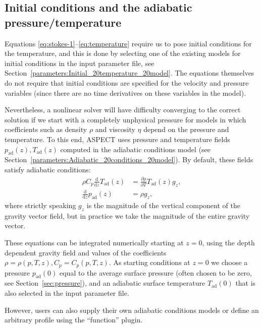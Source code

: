 \documentclass{article}
\newcommand{\aspect}{\textsc{ASPECT}}
\begin{document}
\subsection{Initial conditions and the adiabatic pressure/temperature}
\label{sec:adiabatic}

Equations \eqref{eq:stokes-1}--\eqref{eq:temperature} require us to
pose initial conditions for the temperature, and this is done by
selecting one of the existing models for initial conditions in the
input parameter file, see
Section~\ref{parameters:Initial_20temperature_20model}. The equations
themselves do not require that initial conditions are specified for
the velocity and pressure variables (since there are no time
derivatives on these variables in the model).

Nevertheless, a nonlinear solver will have difficulty converging to
the correct solution if we start with a completely unphysical pressure
for models in which coefficients such as density $\rho$ and viscosity
$\eta$ depend on the pressure and temperature. To this end, \aspect{} 
uses pressure and temperature fields $p_{\textrm{ad}}(z),
T_{\textrm{ad}}(z)$ computed in the adiabatic conditions model 
(see Section~\ref{parameters:Adiabatic_20conditions_20model}).
By default, these fields satisfy adiabatic conditions:
\begin{align}
  \rho C_p \frac{\textrm{d}}{\textrm{d}z} T_{\textrm{ad}}(z)
  &=
  \frac{\partial\rho}{\partial T} T_{\textrm{ad}}(z) g_z,
\\
  \frac{\textrm{d}}{\textrm{d}z} p_{\textrm{ad}}(z)
  &=
  \rho g_z,
\end{align}
where strictly speaking $g_z$ is the magnitude of the vertical
component of the gravity vector field, but in practice we take the
magnitude of the entire gravity vector.

These equations can be integrated numerically starting at $z=0$, using
the depth dependent gravity field and values of the coefficients
$\rho=\rho(p,T,z), C_p=C_p(p,T,z)$. As starting conditions at $z=0$ we
choose a pressure $p_{\textrm{ad}}(0)$ equal to the average surface
pressure (often chosen to be zero, see Section~\ref{sec:pressure}),
and an adiabatic surface temperature $T_{\textrm{ad}}(0)$ that is
also selected in the input parameter file.

However, users can also supply their own adiabatic conditions models or 
define an arbitrary profile using the ``function'' plugin.
\end{document}
